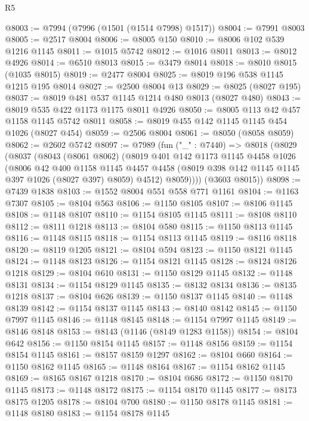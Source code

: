 \begin{lexlean}{R5}
\begin{coremodule}
@8003 := @7994 (@7996 (@1501 (@1514 @7998) @1517))
@8004 := @7991 @8003
@8005 := @2517 @8004
@8006 := @8005 @150
@8010 := @8006 @102 @539 @1216 @1145
@8011 := @1015 @5742
@8012 := @1016 @8011
@8013 := @8012 @4926
@8014 := @6510 @8013
@8015 := @3479 @8014
@8018 := @8010 @8015 (@1035 @8015)
@8019 := @2477 @8004
@8025 := @8019 @196 @538 @1145 @1215 @195 @8014
@8027 := @2500 @8004 @13
@8029 := @8025 (@8027 @195)
@8037 := @8019 @481 @537 @1145 @1214 @480 @8013 (@8027 @480)
@8043 := @8019 @535 @422 @1173 @1175 @8011 @4926
@8050 := @8005 @113 @42 @457 @1158 @1145 @5742 @8011
@8058 := @8019 @455 @142 @1145 @1145 @454 @1026 (@8027 @454)
@8059 := @2506 @8004
@8061 := @8050 (@8058 @8059)
@8062 := @2602 @5742
@8097 := @7989
    (fun ("_" : @7440) =>
    @8018
      (@8029
        (@8037
          (@8043
            (@8061 @8062)
            (@8019
              @401
              @142
              @1173
              @1145
              @4458
              @1026
              (@8006
                @42
                @400
                @1158
                @1145
                @4457
                @4458
                (@8019 @398 @142 @1145 @1145 @397 @1026 (@8027 @397) @8059)
                @4512)
              @8059))))
      (@3603 @8015))
@8098 := @7439 @1838
@8103 := @1552 @8004 @551 @558 @771 @1161
@8104 := @1163 @7307
@8105 := @8104 @563
@8106 := @1150 @8105
@8107 := @8106 @1145
@8108 := @1148 @8107
@8110 := @1154 @8105 @1145
@8111 := @8108 @8110
@8112 := @8111 @1218
@8113 := @8104 @580
@8115 := @1150 @8113 @1145
@8116 := @1148 @8115
@8118 := @1154 @8113 @1145
@8119 := @8116 @8118
@8120 := @8119 @1205
@8121 := @8104 @594
@8123 := @1150 @8121 @1145
@8124 := @1148 @8123
@8126 := @1154 @8121 @1145
@8128 := @8124 @8126 @1218
@8129 := @8104 @610
@8131 := @1150 @8129 @1145
@8132 := @1148 @8131
@8134 := @1154 @8129 @1145
@8135 := @8132 @8134
@8136 := @8135 @1218
@8137 := @8104 @626
@8139 := @1150 @8137 @1145
@8140 := @1148 @8139
@8142 := @1154 @8137 @1145
@8143 := @8140 @8142
@8145 := @1150 @7997 @1145
@8146 := @1148 @8145
@8148 := @1154 @7997 @1145
@8149 := @8146 @8148
@8153 := @8143 (@1146 (@8149 @1283 @1158))
@8154 := @8104 @642
@8156 := @1150 @8154 @1145
@8157 := @1148 @8156
@8159 := @1154 @8154 @1145
@8161 := @8157 @8159 @1297
@8162 := @8104 @660
@8164 := @1150 @8162 @1145
@8165 := @1148 @8164
@8167 := @1154 @8162 @1145
@8169 := @8165 @8167 @1218
@8170 := @8104 @686
@8172 := @1150 @8170 @1145
@8173 := @1148 @8172
@8175 := @1154 @8170 @1145
@8177 := @8173 @8175 @1205
@8178 := @8104 @700
@8180 := @1150 @8178 @1145
@8181 := @1148 @8180
@8183 := @1154 @8178 @1145

\end{coremodule}
\end{lexlean}
